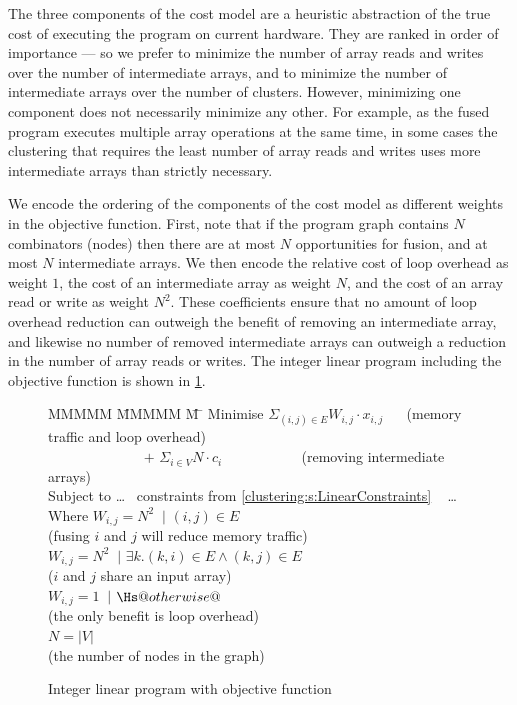 The three components of the cost model are a heuristic abstraction of the true cost of executing the program on current hardware.
They are ranked in order of importance --- so we prefer to minimize the number of array reads and writes over the number of intermediate arrays, and to minimize the number of intermediate arrays over the number of clusters.
However, minimizing one component does not necessarily minimize any other.
For example, as the fused program executes multiple array operations at the same time, in some cases the clustering that requires the least number of array reads and writes uses more intermediate arrays than strictly necessary.

We encode the ordering of the components of the cost model as different weights in the objective function.
First, note that if the program graph contains $N$ combinators (nodes) then there are at most $N$ opportunities for fusion, and at most $N$ intermediate arrays.
We then encode the relative cost of loop overhead as weight $1$, the cost of an intermediate array as weight $N$, and the cost of an array read or write as weight $N^2$.
These coefficients ensure that no amount of loop overhead reduction can outweigh the benefit of removing an intermediate array, and likewise no number of removed intermediate arrays can outweigh a reduction in the number of array reads or writes.
The integer linear program including the objective function is shown in \cref{fig:clustering:ilp-obj}.

\begin{figure}
\begin{tabbing}
MMMMM   \= MMMMM \= M \= \kill
Minimise   \>     $\Sigma_{(i,j) \in E} W_{i,j} \cdot x_{i,j}$   
                        ~~ (memory traffic and loop overhead)
\\ ~~~~~~~~~~~~~ $+$ \> $\Sigma_{i \in V} N \cdot c_i$
                        ~~~~~~~~~~ (removing intermediate arrays)
\\[1ex]
   Subject to  \> \ldots ~ constraints from \cref{clustering:s:LinearConstraints} ~ \ldots 
\\ Where   \> $W_{i,j} = N^2$ \> $~|$ \> $(i,j) \in E $         
\\         \> \> \> (fusing $i$ and $j$ will reduce memory traffic)         
\\         \> $W_{i,j} = N^2$ \> $~|$ \> $\exists k. (k,i) \in E \wedge (k,j) \in E $     
\\         \> \> \> ($i$ and $j$ share an input array)
\\         \> $W_{i,j} = 1$   \> $~|$ \> $\Hs@otherwise@$
\\         \> \> \> (the only benefit is loop overhead)
\\         \> $N = |V|$
\\         \> \> \> (the number of nodes in the graph)
\end{tabbing}
\caption{Integer linear program with objective function}
\label{fig:clustering:ilp-obj}
\end{figure}

